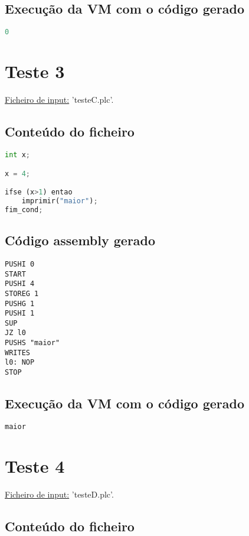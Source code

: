 \documentclass[11pt,a4paper]{report}
\begin{document}
\subsection{Execução da VM com o código gerado}
\begin{lstlisting}[language=python]
0
\end{lstlisting}

\section{Teste 3}

\underline{Ficheiro de input:} 'testeC.plc'.

\subsection{Conteúdo do ficheiro}

\begin{lstlisting}[language=python]
int x;

x = 4;

ifse (x>1) entao 
    imprimir("maior");
fim_cond;
\end{lstlisting}

\subsection{Código assembly gerado}
\begin{lstlisting}[languague=Assembler]
PUSHI 0
START
PUSHI 4
STOREG 1
PUSHG 1
PUSHI 1
SUP
JZ l0
PUSHS "maior"
WRITES
l0: NOP
STOP
\end{lstlisting}

\subsection{Execução da VM com o código gerado}
\begin{lstlisting}[language=python]
maior
\end{lstlisting}

\section{Teste 4}

\underline{Ficheiro de input:} 'testeD.plc'.

\subsection{Conteúdo do ficheiro}
\end{document}
